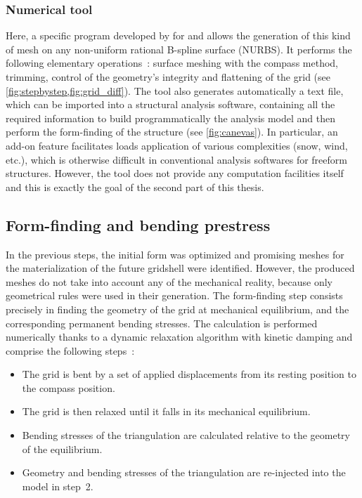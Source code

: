 \subsubsection{Numerical tool}
Here, a specific program developed by \citet{DuPeloux2011} for \rhino{} and \grasshopper{} allows the generation of this kind of mesh on any non-uniform rational B-spline surface (NURBS). It performs the following elementary operations~: surface meshing with the compass method, trimming, control of the geometry’s integrity and flattening of the grid (see \cref{fig:stepbystep,fig:grid_diff}). The tool also generates automatically a text file, which can be imported into a structural analysis software, containing all the required information to build programmatically the analysis model and then perform the form-finding of the structure (see \cref{fig:canevas}). In particular, an add-on feature facilitates loads application of various complexities (snow, wind, etc.), which is otherwise difficult in conventional analysis softwares for freeform structures. However, the tool does not provide any computation facilities itself and this is exactly the goal of the second part of this thesis.

\subsection{Form-finding and bending prestress}\label{sec=form-finding}
In the previous steps, the initial form was optimized and promising meshes for the materialization of the future gridshell were identified. However, the produced meshes do not take into account any of the mechanical reality, because only geometrical rules were used in their generation. The form-finding step consists precisely in finding the geometry of the grid at mechanical equilibrium, and the corresponding permanent bending stresses. The calculation is performed numerically thanks to a dynamic relaxation algorithm with kinetic damping and comprise the following steps~:
\begin{itemize}
\item The grid is bent by a set of applied displacements from its resting position to the compass position.
\item The grid is then relaxed until it falls in its mechanical equilibrium.
\item Bending stresses of the triangulation are calculated relative to the geometry of the equilibrium.
\item Geometry and bending stresses of the triangulation are re-injected into the model in step~2.
\end{itemize}

